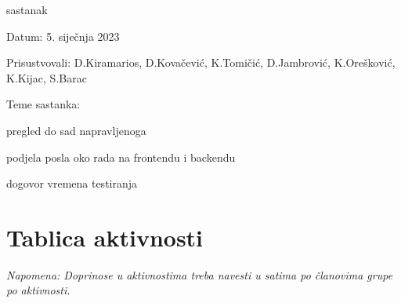 \begin{packed_enum}
                \item  sastanak
			\item[] \begin{packed_item}
				\item Datum: 5. siječnja 2023
				\item Prisustvovali: D.Kiramarios, D.Kovačević, K.Tomičić, D.Jambrović, K.Orešković, K.Kijac, S.Barac
				\item Teme sastanka:
				\begin{packed_item}
					\item pregled do sad napravljenoga
            	    \item podjela posla oko rada na frontendu i backendu
                        \item dogovor vremena testiranja
				\end{packed_item}
			\end{packed_item}
			
		\end{packed_enum}
		
		\eject
		\section*{Tablica aktivnosti}
		
			
			 \textit{Napomena: Doprinose u aktivnostima treba navesti u satima po članovima grupe po aktivnosti.}

